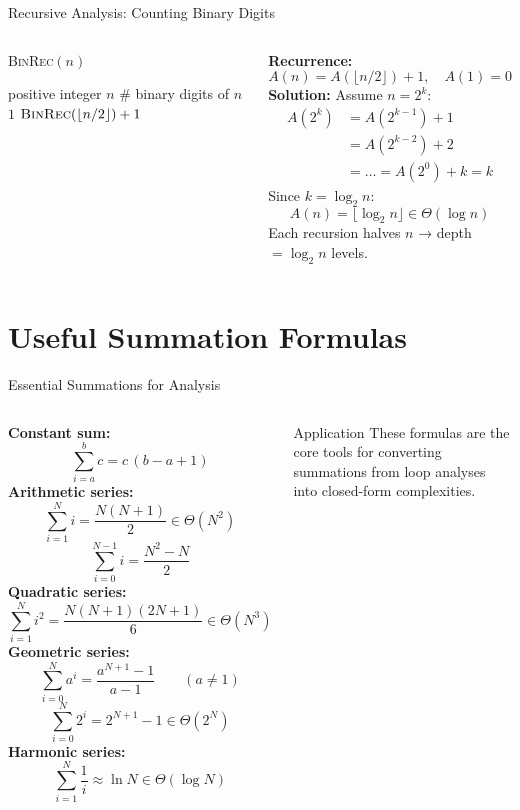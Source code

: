 \documentclass[aspectratio=169]{beamer}
\begin{document}
\begin{frame}[shrink=12]{Recursive Analysis: Counting Binary Digits}
  \begin{columns}[T]
      \begin{block}{\textsc{BinRec}$(n)$}
        \begin{algorithmic}[1]
          \Require positive integer $n$
          \Ensure \# binary digits of $n$
           \Return $1$ \EndIf
          \State \Return $\textsc{BinRec}(\lfloor n/2 \rfloor) + 1$
        \end{algorithmic}
      \end{block}
      \vspace{0.3em}
      \textbf{Recurrence:}
      \[
        A(n) = A\!\left(\lfloor n/2\rfloor\right) + 1, \quad A(1) = 0
      \]
      \textbf{Solution:} Assume $n = 2^k$:
      \begin{align*}
        A(2^k) &= A(2^{k-1}) + 1 \\
               &= A(2^{k-2}) + 2 \\
               &= \ldots = A(2^0) + k = k
      \end{align*}
      Since $k = \log_2 n$:
      \[
        \boxed{A(n) = \lfloor\log_2 n\rfloor \in \Theta(\log n)}
      \]
      \vspace{0.3em}
      Each recursion halves $n$ → depth $= \log_2 n$ levels.
  \end{columns}
\end{frame}

\section{Useful Summation Formulas}

\begin{frame}[shrink=28]{Essential Summations for Analysis}
  \begin{columns}[T]
      \textbf{Constant sum:}
      \[
        \sum_{i=a}^{b} c = c\,(b-a+1)
      \]
      \textbf{Arithmetic series:}
      \[
        \sum_{i=1}^{N} i = \frac{N(N+1)}{2} \in \Theta(N^2)
      \]
      \[
        \sum_{i=0}^{N-1} i = \frac{N^2-N}{2}
      \]
      \textbf{Quadratic series:}
      \[
        \sum_{i=1}^{N} i^2 = \frac{N(N+1)(2N+1)}{6} \in \Theta(N^3)
      \]
      \textbf{Geometric series:}
      \[
        \sum_{i=0}^{N} a^i = \frac{a^{N+1}-1}{a-1} \qquad (a\neq 1)
      \]
      \[
        \sum_{i=0}^{N} 2^i = 2^{N+1} - 1 \in \Theta(2^N)
      \]
      \textbf{Harmonic series:}
      \[
        \sum_{i=1}^{N} \frac{1}{i} \approx \ln N \in \Theta(\log N)
      \]
      \vspace{0.3em}
      \begin{exampleblock}{Application}
        These formulas are the core tools for converting summations
        from loop analyses into closed-form complexities.
      \end{exampleblock}
  \end{columns}
\end{frame}
\end{document}

